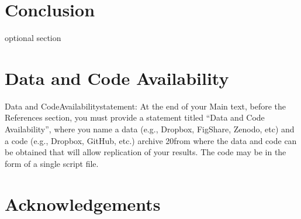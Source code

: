 \documentclass[11pt, a4paper, titlepage]{article}
\begin{document}
     \section*{Conclusion }
     optional section
     \clearpage
    
    \section*{Data and Code Availability}
    Data  and  CodeAvailabilitystatement:  At  the  end  of  your  Main  text,  before  the  References section, you must provide a statement titled “Data and Code Availability”, where you name a data (e.g., Dropbox, FigShare, Zenodo, etc) and a code (e.g., Dropbox, GitHub, etc.) archive 
    20from where the data and code can be obtained that will allow replication of your results. The code may be in the form of a single script file.
    
    \clearpage
    \section*{Acknowledgements}
    

    
\end{document}
